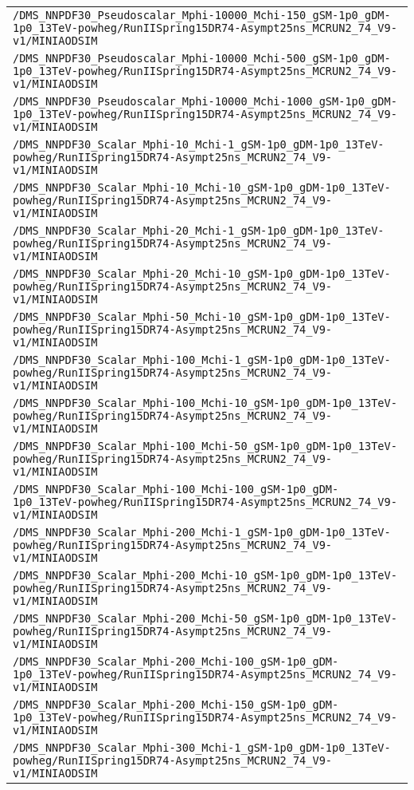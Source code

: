 \begin{center}
\begin{tabular}{l}
\verb!/DMS_NNPDF30_Pseudoscalar_Mphi-10000_Mchi-150_gSM-1p0_gDM-1p0_13TeV-powheg/RunIISpring15DR74-Asympt25ns_MCRUN2_74_V9-v1/MINIAODSIM! \tabularnewline
\verb!/DMS_NNPDF30_Pseudoscalar_Mphi-10000_Mchi-500_gSM-1p0_gDM-1p0_13TeV-powheg/RunIISpring15DR74-Asympt25ns_MCRUN2_74_V9-v1/MINIAODSIM! \tabularnewline
\verb!/DMS_NNPDF30_Pseudoscalar_Mphi-10000_Mchi-1000_gSM-1p0_gDM-1p0_13TeV-powheg/RunIISpring15DR74-Asympt25ns_MCRUN2_74_V9-v1/MINIAODSIM! \tabularnewline
\verb!/DMS_NNPDF30_Scalar_Mphi-10_Mchi-1_gSM-1p0_gDM-1p0_13TeV-powheg/RunIISpring15DR74-Asympt25ns_MCRUN2_74_V9-v1/MINIAODSIM! \tabularnewline
\verb!/DMS_NNPDF30_Scalar_Mphi-10_Mchi-10_gSM-1p0_gDM-1p0_13TeV-powheg/RunIISpring15DR74-Asympt25ns_MCRUN2_74_V9-v1/MINIAODSIM! \tabularnewline
\verb!/DMS_NNPDF30_Scalar_Mphi-20_Mchi-1_gSM-1p0_gDM-1p0_13TeV-powheg/RunIISpring15DR74-Asympt25ns_MCRUN2_74_V9-v1/MINIAODSIM! \tabularnewline
\verb!/DMS_NNPDF30_Scalar_Mphi-20_Mchi-10_gSM-1p0_gDM-1p0_13TeV-powheg/RunIISpring15DR74-Asympt25ns_MCRUN2_74_V9-v1/MINIAODSIM! \tabularnewline
\verb!/DMS_NNPDF30_Scalar_Mphi-50_Mchi-10_gSM-1p0_gDM-1p0_13TeV-powheg/RunIISpring15DR74-Asympt25ns_MCRUN2_74_V9-v1/MINIAODSIM! \tabularnewline
\verb!/DMS_NNPDF30_Scalar_Mphi-100_Mchi-1_gSM-1p0_gDM-1p0_13TeV-powheg/RunIISpring15DR74-Asympt25ns_MCRUN2_74_V9-v1/MINIAODSIM! \tabularnewline
\verb!/DMS_NNPDF30_Scalar_Mphi-100_Mchi-10_gSM-1p0_gDM-1p0_13TeV-powheg/RunIISpring15DR74-Asympt25ns_MCRUN2_74_V9-v1/MINIAODSIM! \tabularnewline
\verb!/DMS_NNPDF30_Scalar_Mphi-100_Mchi-50_gSM-1p0_gDM-1p0_13TeV-powheg/RunIISpring15DR74-Asympt25ns_MCRUN2_74_V9-v1/MINIAODSIM! \tabularnewline
\verb!/DMS_NNPDF30_Scalar_Mphi-100_Mchi-100_gSM-1p0_gDM-1p0_13TeV-powheg/RunIISpring15DR74-Asympt25ns_MCRUN2_74_V9-v1/MINIAODSIM! \tabularnewline
\verb!/DMS_NNPDF30_Scalar_Mphi-200_Mchi-1_gSM-1p0_gDM-1p0_13TeV-powheg/RunIISpring15DR74-Asympt25ns_MCRUN2_74_V9-v1/MINIAODSIM! \tabularnewline
\verb!/DMS_NNPDF30_Scalar_Mphi-200_Mchi-10_gSM-1p0_gDM-1p0_13TeV-powheg/RunIISpring15DR74-Asympt25ns_MCRUN2_74_V9-v1/MINIAODSIM! \tabularnewline
\verb!/DMS_NNPDF30_Scalar_Mphi-200_Mchi-50_gSM-1p0_gDM-1p0_13TeV-powheg/RunIISpring15DR74-Asympt25ns_MCRUN2_74_V9-v1/MINIAODSIM! \tabularnewline
\verb!/DMS_NNPDF30_Scalar_Mphi-200_Mchi-100_gSM-1p0_gDM-1p0_13TeV-powheg/RunIISpring15DR74-Asympt25ns_MCRUN2_74_V9-v1/MINIAODSIM! \tabularnewline
\verb!/DMS_NNPDF30_Scalar_Mphi-200_Mchi-150_gSM-1p0_gDM-1p0_13TeV-powheg/RunIISpring15DR74-Asympt25ns_MCRUN2_74_V9-v1/MINIAODSIM! \tabularnewline
\verb!/DMS_NNPDF30_Scalar_Mphi-300_Mchi-1_gSM-1p0_gDM-1p0_13TeV-powheg/RunIISpring15DR74-Asympt25ns_MCRUN2_74_V9-v1/MINIAODSIM! \tabularnewline

\end{tabular}
\end{center}
